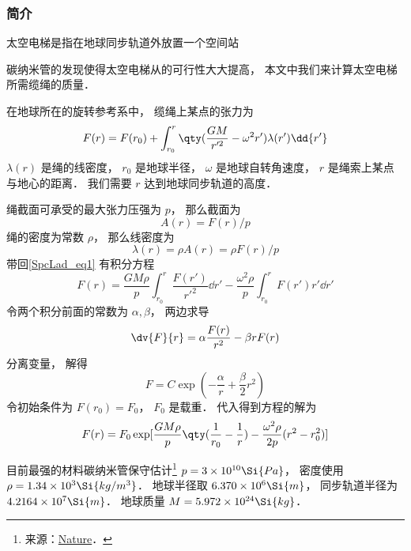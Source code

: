 

\subsubsection{简介}
太空电梯是指在地球同步轨道外放置一个空间站

碳纳米管的发现使得太空电梯从的可行性大大提高， 本文中我们来计算太空电梯所需缆绳的质量．

在地球所在的旋转参考系中， 缆绳上某点的张力为
\begin{equation}\label{SpcLad_eq1}
F(r) = F(r_0) + \int_{r_0}^{r} \qty(\frac{GM}{r'^2} - \omega^2 r') \lambda(r') \dd{r'}
\end{equation}
$\lambda(r)$ 是绳的线密度， $r_0$ 是地球半径， $\omega$ 是地球自转角速度， $r$ 是绳索上某点与地心的距离． 我们需要 $r$ 达到地球同步轨道的高度．

绳截面可承受的最大张力压强为 $p$， 那么截面为
\begin{equation}
A(r) = F(r)/p
\end{equation}
绳的密度为常数 $\rho$， 那么线密度为
\begin{equation}
\lambda(r) = \rho A(r) = \rho F(r)/p
\end{equation}
带回\autoref{SpcLad_eq1} 有积分方程
\begin{equation}
F(r) = \frac{GM\rho}{p} \int_{r_0}^{r} \frac{F(r')}{r'^2} \dd{r'} - \frac{\omega^2\rho}{p}\int_{r_0}^r F(r') r' \dd{r'}
\end{equation}
令两个积分前面的常数为 $\alpha, \beta$， 两边求导
\begin{equation}
\dv{F}{r} = \alpha \frac{F(r)}{r^2} - \beta r F(r)
\end{equation}
分离变量， 解得
\begin{equation}
F = C\exp(-\frac{\alpha}{r} + \frac{\beta}{2} r^2)
\end{equation}
令初始条件为 $F(r_0) = F_0$， $F_0$ 是载重． 代入得到方程的解为
\begin{equation}
F(r) = F_0 \exp[\frac{GM\rho}{p} \qty(\frac{1}{r_0} - \frac{1}{r}) - \frac{\omega^2\rho}{2p}(r^2 - r_0^2)]
\end{equation}

目前最强的材料碳纳米管保守估计\footnote{来源：\href{https://www.nature.com/articles/s41467-019-10959-7}{Nature}．} $p = 3\times 10^{10} \Si{Pa}$， 密度使用 $\rho = 1.34\times 10^{3} \Si{kg/m^3}$． 地球半径取 $6.370\times 10^6\Si{m}$， 同步轨道半径为 $4.2164\times 10^7 \Si{m}$． 地球质量 $M = 5.972 \times 10^{24} \Si{kg}$．

